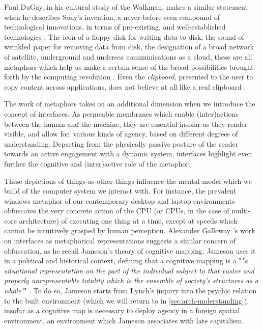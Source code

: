 Paul DuGay, in his cultural study of the Walkman, makes a similar statement when he describes Sony's invention, a never-before-seen compound of technological innovations, in terms of pre-existing, and well-established technologies \citep{gay_doing_2013}. The icon of a floppy disk for writing data to disk, the sound of wrinkled paper for removing data from disk, the designation of a broad network of satellite, underground and undersea communications as a cloud, these are all metaphors which help us make a certain sense of the broad possibilities brought forth by the computing revolution \citep{wyatt_danger_2004}. Even the \emph{clipboard}, presented to the user to copy content across applications, does not believe at all like a real clipboard \citep{barrera_how_2022}.

The work of metaphors takes on an additional dimension when we introduce the concept of interfaces. As permeable membranes which enable (inter)actions between the human and the machine, they are essential insofar as they render visible, and allow for, various kinds of agency, based on different degrees of understanding. Departing from the physically passive posture of the reader towards an active engagement with a dynamic system, interfaces highlight even further the cognitive and (inter)active role of the metaphor.

These depictions of things-as-other-things influence the mental model which we build of the computer system we interact with. For instance, the prevalent windows metaphor of our contemporary desktop and laptop environments obfuscates the very concrete action of the CPU (or CPUs, in the case of multi-core architecture) of executing one thing at a time, except at speeds which cannot be intuitively grasped by human perception. Alexander Galloway 's work on interfaces as metaphorical representations suggests a similar concern of obfuscation, as he recall Jameson's theory of cognitive mapping. Jameson uses it in a political and historical context, defining that a cognitive mapping is a "\emph{"a situational representation on the part of the individual subject to that vaster and properly unrepresentable totality which is the ensemble of society's structures as a whole"}" \citep{jameson_postmodernism_1991}. To do so, Jameson starts from Lynch's inquiry into the psychic relation to the built environment (which we will return to in \autoref{sec:arch-understanding}), insofar as a cognitive map is necessary to deploy agency in a foreign spatial environment, an environment which Jameson associates with late capitalism. 


